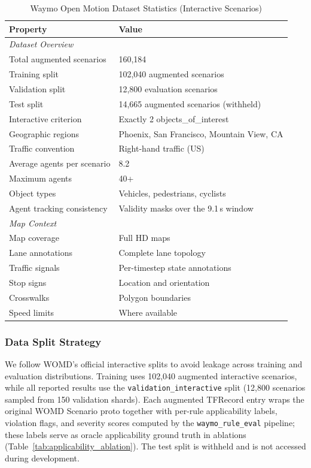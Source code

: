 \begin{table}[t]
\centering
\caption{Waymo Open Motion Dataset Statistics (Interactive Scenarios)}
\label{tab:womd_stats}
\begin{tabular}{ll}
\toprule
\textbf{Property} & \textbf{Value} \\
\midrule
\multicolumn{2}{l}{\textit{Dataset Overview}} \\
Total augmented scenarios & 160,184 \\
Training split & 102,040 augmented scenarios \\
Validation split & 12,800 evaluation scenarios \\
Test split & 14,665 augmented scenarios (withheld) \\
Interactive criterion & Exactly 2 objects\_of\_interest \\
Geographic regions & Phoenix, San Francisco, Mountain View, CA \\
Traffic convention & Right-hand traffic (US) \\
Average agents per scenario & 8.2 \\
Maximum agents & 40+ \\
Object types & Vehicles, pedestrians, cyclists \\
Agent tracking consistency & Validity masks over the 9.1\,s window \\
\midrule
\multicolumn{2}{l}{\textit{Map Context}} \\
Map coverage & Full HD maps \\
Lane annotations & Complete lane topology \\
Traffic signals & Per-timestep state annotations \\
Stop signs & Location and orientation \\
Crosswalks & Polygon boundaries \\
Speed limits & Where available \\
\bottomrule
\end{tabular}
\end{table}

\subsubsection{Data Split Strategy}

We follow WOMD's official interactive splits to avoid leakage across training and evaluation distributions.  Training uses 102,040 augmented interactive scenarios, while all reported results use the \texttt{validation\_interactive} split (12{,}800 scenarios sampled from 150 validation shards).  Each augmented TFRecord entry wraps the original WOMD Scenario proto together with per-rule applicability labels, violation flags, and severity scores computed by the \texttt{waymo\_rule\_eval} pipeline; these labels serve as oracle applicability ground truth in ablations (Table~\ref{tab:applicability_ablation}).  The test split is withheld and is not accessed during development.

